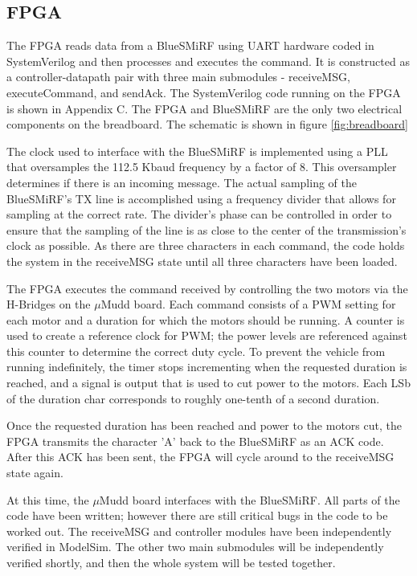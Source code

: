 \documentclass[11pt]{article}
\begin{document}
\subsection{FPGA}
The FPGA reads data from a BlueSMiRF using UART hardware coded in SystemVerilog and then processes and executes the command.  It is constructed as a controller-datapath pair with three main submodules - receiveMSG, executeCommand, and sendAck.  The SystemVerilog code running on the FPGA is shown in Appendix C. The FPGA and BlueSMiRF are the only two electrical components on the breadboard. The schematic is shown in figure \ref{fig:breadboard}

The clock used to interface with the BlueSMiRF is implemented using a PLL that oversamples the 112.5 Kbaud frequency by a factor of 8.  This oversampler determines if there is an incoming message.  The actual sampling of the BlueSMiRF's TX line is accomplished using a frequency divider that allows for sampling at the correct rate.  The divider's phase can be controlled in order to ensure that the sampling of the line is as close to the center of the transmission's clock as possible.  As there are three characters in each command, the code holds the system in the receiveMSG state until all three characters have been loaded.

The FPGA executes the command received by controlling the two motors via the H-Bridges on the $\mu$Mudd board. Each command consists of a PWM setting for each motor and a duration for which the motors should be running.  A counter is used to create a reference clock for PWM; the power levels are referenced against this counter to determine the correct duty cycle.  To prevent the vehicle from running indefinitely, the timer stops incrementing when the requested duration is reached, and a signal is output that is used to cut power to the motors.  Each LSb of the duration char corresponds to roughly one-tenth of a second duration.

Once the requested duration has been reached and power to the motors cut, the FPGA transmits the character 'A' back to the BlueSMiRF as an ACK code.  After this ACK has been sent, the FPGA will cycle around to the receiveMSG state again.

At this time, the $\mu$Mudd board interfaces with the BlueSMiRF.  All parts of the code have been written; however there are still critical bugs in the code to be worked out.  The receiveMSG and controller modules have been independently verified in ModelSim.  The other two main submodules will be independently verified shortly, and then the whole system will be tested together.
\end{document}
